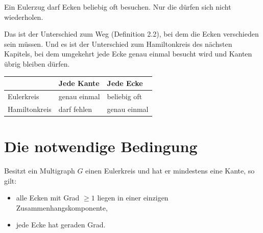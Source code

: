 \begin{warnung}
Ein Eulerzug darf Ecken beliebig oft besuchen. Nur die  dürfen sich nicht wiederholen.

Das ist der Unterschied zum Weg (Definition 2.2), bei dem die Ecken verschieden sein müssen. Und es ist der Unterschied zum Hamiltonkreis des nächsten Kapitels, bei dem umgekehrt jede Ecke genau einmal besucht wird und Kanten übrig bleiben dürfen.

\begin{center}
\renewcommand{\arraystretch}{1.5}
\begin{tabular}{@{}P{2.6cm}P{2.6cm}P{2.6cm}@{}}
\toprule
& \textbf{Jede Kante} & \textbf{Jede Ecke}\\
\midrule
Eulerkreis & \textcolor{gruen}{genau einmal} & beliebig oft\\
Hamiltonkreis & darf fehlen & \textcolor{gruen}{genau einmal}\\
\bottomrule
\end{tabular}
\end{center}

\begin{center}
\begin{minipage}{0.88\textwidth}
\end{minipage}
\end{center}
\end{warnung}

\section{Die notwendige Bedingung}

\begin{merksatz}
Besitzt ein Multigraph $G$ einen Eulerkreis und hat er mindestens eine Kante, so gilt:
\begin{itemize}[leftmargin=1.4em, itemsep=2pt]
\item alle Ecken mit Grad $\ge 1$ liegen in einer einzigen Zusammenhangskomponente,
\item jede Ecke hat geraden Grad.
\end{itemize}
\end{merksatz}

